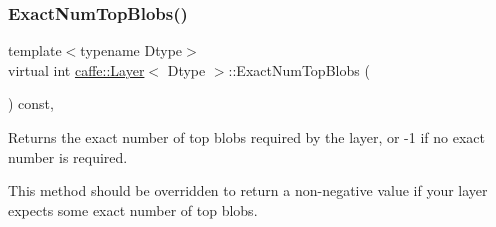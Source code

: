 \subsubsection{\texorpdfstring{Exact\+Num\+Top\+Blobs()}{ExactNumTopBlobs()}\hspace{0.1cm}{\footnotesize\ttfamily [1/2]}}
{\footnotesize\ttfamily template$<$typename Dtype$>$ \\
virtual int \mbox{\hyperlink{classcaffe_1_1_layer}{caffe\+::\+Layer}}$<$ Dtype $>$\+::Exact\+Num\+Top\+Blobs (\begin{DoxyParamCaption}{ }\end{DoxyParamCaption}) const\hspace{0.3cm}{\ttfamily [inline]}, {\ttfamily [virtual]}}



Returns the exact number of top blobs required by the layer, or -\/1 if no exact number is required. 

This method should be overridden to return a non-\/negative value if your layer expects some exact number of top blobs. 

